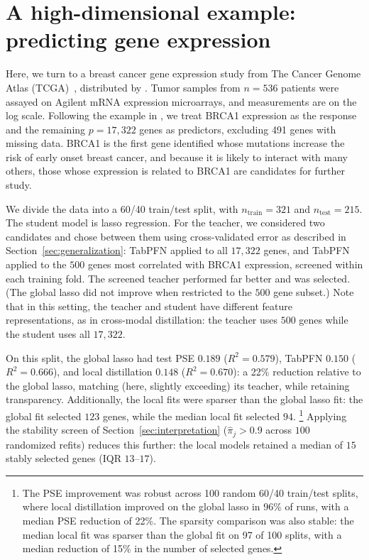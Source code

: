 \documentclass[12pt]{article}
\theoremstyle{definition}
\begin{document}
\section{A high-dimensional example: predicting gene expression}
\label{sec:bctcga}

Here, we turn to a breast cancer gene expression study from The Cancer Genome Atlas (TCGA)~\citep{tcga2012}, distributed by \citet{breheny2025hdrm}. Tumor samples from $n = 536$ patients were assayed on Agilent mRNA expression microarrays, and measurements are on the log scale. Following the example in \citet{breheny2025hdrm}, we treat BRCA1 expression as the response and the remaining $p = 17{,}322$ genes as predictors, excluding 491 genes with missing data. BRCA1 is the first gene identified whose mutations increase the risk of early onset breast cancer, and because it is likely to interact with many others, those whose expression is related to BRCA1 are candidates for further study.

We divide the data into a 60/40 train/test split, with $n_{\text{train}} = 321$ and $n_{\text{test}} = 215$. The student model is lasso regression. 
For the teacher, we considered two candidates and chose between them using cross-validated error as described in Section~\ref{sec:generalization}: TabPFN applied to all $17{,}322$ genes, and TabPFN applied to the $500$ genes most correlated with BRCA1 expression, screened within each training fold. 
The screened teacher performed far better and was selected. (The global lasso did not improve when restricted to the $500$ gene subset.) 
Note that in this setting, the teacher and student have different feature representations, as in cross-modal distillation: the teacher uses $500$ genes while the student uses all $17{,}322$.

On this split, the global lasso had test PSE $0.189$ ($R^2 = 0.579$), TabPFN $0.150$ ($R^2 = 0.666$), and local distillation $0.148$ ($R^2 = 0.670$): a 22\% reduction relative to the global lasso, matching (here, slightly exceeding) its teacher, while retaining transparency. Additionally, the local fits were sparser than the global lasso fit: the global fit selected $123$ genes, while the median local fit selected $94$.%
\footnote{The PSE improvement was robust across 100 random 60/40 train/test splits, where local distillation improved on the global lasso in 96\% of runs, with a median PSE reduction of 22\%. The sparsity comparison was also stable: the median local fit was sparser than the global fit on 97 of 100 splits, with a median reduction of 15\% in the number of selected genes.}  
Applying the stability screen of Section~\ref{sec:interpretation} ($\hat\pi_j > 0.9$ across $100$ randomized refits) reduces this further: the local models retained a median of $15$ stably selected genes (IQR $13$–$17$).
\end{document}
